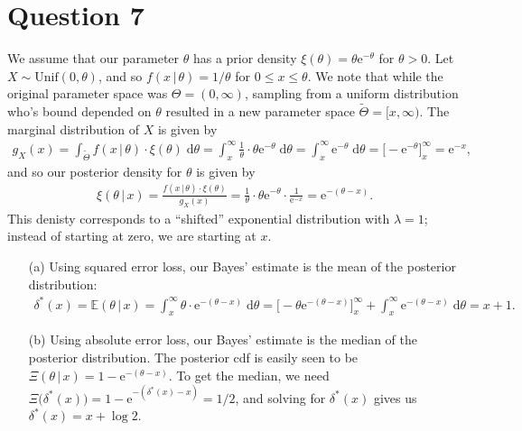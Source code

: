 \documentclass[10pt]{article}
\begin{document}
\section{Question 7} \noindent
We assume that our parameter \(\theta\) has a prior density \(\xi(\theta) = \theta \mathrm{e}^{-\theta}\) for \(\theta > 0\). 
Let \(X \sim \mathrm{Unif}(0, \theta)\), and so \(f(x \,|\, \theta) = 1 / \theta\) for \(0 \le x \le \theta\). We note that while the original parameter space
was \(\Theta = (0, \infty)\), sampling from a uniform distribution who's bound depended on \(\theta\) resulted in a new parameter space 
\(\tilde{\Theta} = [x, \infty)\). 
The marginal distribution of \(X\) is given by 
\begin{align*}
    g_{X}(x) 
    = \int_{\tilde{\Theta}} f(x \,|\, \theta) \cdot \xi(\theta) \;\mathrm{d}\theta
    = \int_x^{\infty} \frac{1}{\theta} \cdot \theta \mathrm{e}^{- \theta} \;\mathrm{d}\theta
    = \int_x^{\infty} \mathrm{e}^{- \theta} \;\mathrm{d}\theta
    = \Big[ -\mathrm{e}^{-\theta} \Big]_x^{\infty}
    = \mathrm{e}^{-x},
\end{align*}
and so our posterior density for \(\theta\) is given by 
\begin{align*}
    \xi(\theta \,|\, x) 
    = \frac{f(x \,|\, \theta) \cdot \xi(\theta)}{g_X(x)}
    = \frac{1}{\theta} \cdot \theta \mathrm{e}^{-\theta} \cdot \frac{1}{\mathrm{e}^{-x}}
    = \mathrm{e}^{-(\theta - x)}.
\end{align*}
This denisty corresponds to a ``shifted'' exponential distribution with \(\lambda = 1\); instead of starting at zero, we are starting at \(x\).
\begin{itemize}
    \item[(a)] Using squared error loss, our Bayes' estimate is the mean of the posterior distribution:
    \begin{align*}
        \delta^*(x)
        = \mathbb{E}(\theta \,|\, x)
        = \int_x^{\infty} \theta \cdot \mathrm{e}^{-(\theta - x)} \;\mathrm{d}\theta
        = \Big[ -\theta \mathrm{e}^{-(\theta - x)} \Big]_x^{\infty} + \int_x^{\infty} \mathrm{e}^{-(\theta - x)} \;\mathrm{d}\theta
        = x + 1.
    \end{align*}
    \item[(b)] Using absolute error loss, our Bayes' estimate is the median of the posterior distribution. 
    The posterior cdf is easily seen to be \(\Xi(\theta \,|\, x) = 1 - \mathrm{e}^{-(\theta - x)}\).
    To get the median, we need 
    \(\Xi \big( \delta^*(x) \big) = 1 - \mathrm{e}^{-(\delta^*(x) - x)} = 1/2\), and solving for \(\delta^*(x)\) gives us \(\delta^*(x) = x + \log 2\).
\end{itemize}
\end{document}
